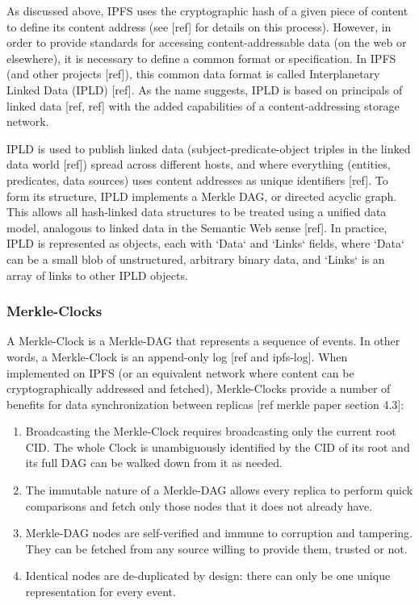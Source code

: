 \documentclass{comjnl}
\begin{document}
As discussed above, IPFS uses the cryptographic hash of a given piece of content to define its content address (see [ref] for details on this process). However, in order to provide standards for accessing content-addressable data (on the web or elsewhere), it is necessary to define a common format or specification. In IPFS (and other projects [ref]), this common data format is called Interplanetary Linked Data (IPLD) [ref]. As the name suggests, IPLD is based on principals of linked data [ref, ref] with the added capabilities of a content-addressing storage network. 

IPLD is used to publish linked data (subject-predicate-object triples in the linked data world [ref]) spread across different hosts, and where everything (entities, predicates, data sources) uses content addresses as unique identifiers [ref]. To form its structure, IPLD implements a Merkle DAG, or directed acyclic graph. This allows all hash-linked data structures to be treated using a unified data model, analogous to linked data in the Semantic Web sense [ref]. In practice, IPLD is represented as objects, each with `Data` and `Links` fields, where `Data` can be a small blob of unstructured, arbitrary binary data, and `Links` is an array of links to other IPLD objects. 

\subsubsection{Merkle-Clocks} \label{sec:merkleclocks}

A Merkle-Clock is a Merkle-DAG that represents a sequence of events. In other words, a Merkle-Clock is an append-only log [ref and ipfs-log]. When implemented on IPFS (or an equivalent network where content can be cryptographically addressed and fetched), Merkle-Clocks provide a number of benefits for data synchronization between replicas [ref merkle paper section 4.3]:

\begin{enumerate}
\item \label{Perf1}Broadcasting the Merkle-Clock requires broadcasting only the current root CID. The whole Clock is unambiguously identified by the CID of its root and its full DAG can be walked down from it as needed.
\item \label{Perf2}The immutable nature of a Merkle-DAG allows every replica to perform quick comparisons and fetch only those nodes that it does not already have.
\item \label{Perf3} Merkle-DAG nodes are self-verified and immune to corruption and tampering. They can be fetched from any source willing to provide them, trusted or not.
\item \label{Perf4} Identical nodes are de-duplicated by design: there can only be one unique representation for every event.
\end{enumerate}
\end{document}
